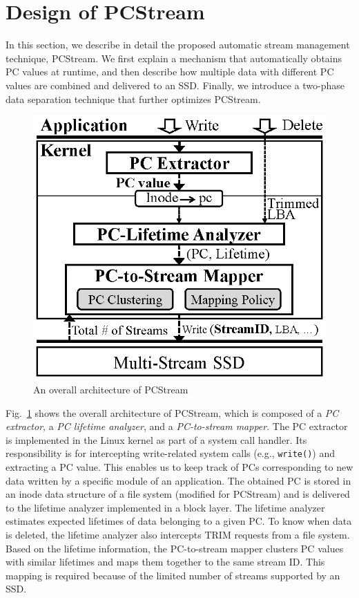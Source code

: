 \section{Design of PCStream}
In this section, we describe in detail the proposed automatic stream management
technique, {\sf PCStream}.  We first explain a mechanism that automatically
obtains PC values at runtime, and then describe how multiple data with
different PC values are combined and delivered to an SSD. Finally, we introduce
a two-phase data separation technique that further optimizes {\sf PCStream}.

\begin{figure}[b]
	\centering
	\vspace{-15pt}
	\includegraphics[width=0.6\linewidth]{figure/architecture4}
	\vspace{-10pt}
	\caption{An overall architecture of {\sf PCStream}}
	\label{fig:architecture}
\end{figure}

Fig.~\ref{fig:architecture} shows the overall architecture of {\sf PCStream},
which is composed of a \textit{PC extractor}, a \textit{PC lifetime analyzer},
and a \textit{PC-to-stream mapper}.  The PC extractor is implemented in the
Linux kernel as part of a system call handler. Its responsibility is for
intercepting write-related system calls (e.g., \texttt{write()}) and extracting
a PC value.  This enables us to keep track of PCs corresponding to new data
written by a specific module of an application.  The obtained PC is stored in
an inode data structure of a file system (modified for \textsf{PCStream}) and
is delivered to the lifetime analyzer implemented in a block layer.  The
lifetime analyzer estimates expected lifetimes of data belonging to a given PC.
To know when data is deleted, the lifetime analyzer also intercepts TRIM
requests from a file system.  Based on the lifetime information, the
PC-to-stream mapper clusters PC values with similar lifetimes and maps them
together to the same stream ID.  This mapping is required because of the
limited number of streams supported by an SSD.


